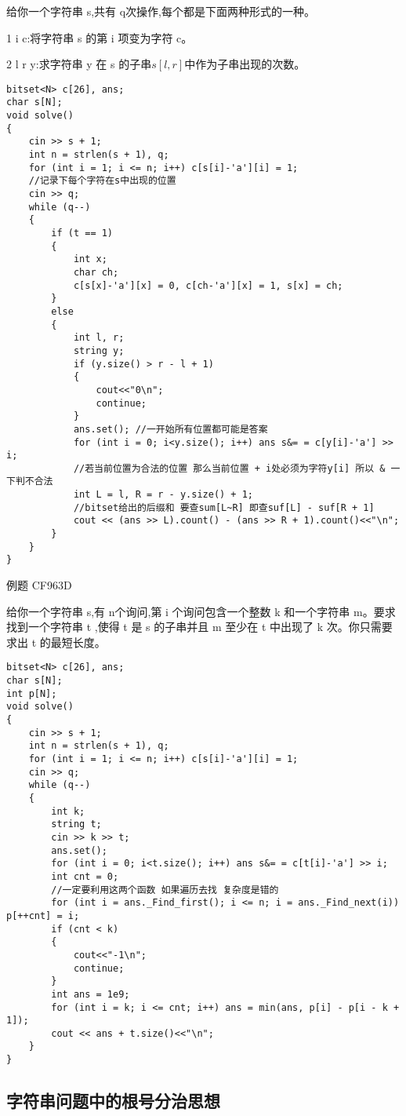 \documentclass[a4paper, fontset=none]{ctexart}
\begin{document}
给你一个字符串 s,共有 q次操作,每个都是下面两种形式的一种。

1 i c:将字符串 s 的第 i 项变为字符 c。

2 l r y:求字符串 y 在 s 的子串$s [l , r]$中作为子串出现的次数。

\begin{verbatim}
bitset<N> c[26], ans;
char s[N];
void solve()
{
    cin >> s + 1;
    int n = strlen(s + 1), q;
    for (int i = 1; i <= n; i++) c[s[i]-'a'][i] = 1;
    //记录下每个字符在s中出现的位置
    cin >> q;
    while (q--)
    {
        if (t == 1)
        {
            int x;
            char ch;
            c[s[x]-'a'][x] = 0, c[ch-'a'][x] = 1, s[x] = ch;
        }
        else
        {
            int l, r;
            string y;
            if (y.size() > r - l + 1)
            {
                cout<<"0\n";
                continue;
            }
            ans.set(); //一开始所有位置都可能是答案
            for (int i = 0; i<y.size(); i++) ans s&= = c[y[i]-'a'] >> i;
            //若当前位置为合法的位置 那么当前位置 + i处必须为字符y[i] 所以 & 一下判不合法
            int L = l, R = r - y.size() + 1;
            //bitset给出的后缀和 要查sum[L~R] 即查suf[L] - suf[R + 1]
            cout << (ans >> L).count() - (ans >> R + 1).count()<<"\n";
        }
    }
}
\end{verbatim}

例题 CF963D

给你一个字符串 s,有 n个询问,第 i 个询问包含一个整数 k 和一个字符串 m。要求找到一个字符串 t ,使得 t 是 s 的子串并且 m 至少在 t 中出现了 k 次。你只需要求出 t 的最短长度。

\begin{verbatim}
bitset<N> c[26], ans;
char s[N];
int p[N];
void solve()
{
    cin >> s + 1;
    int n = strlen(s + 1), q;
    for (int i = 1; i <= n; i++) c[s[i]-'a'][i] = 1;
    cin >> q;
    while (q--)
    {
        int k;
        string t;
        cin >> k >> t;
        ans.set();
        for (int i = 0; i<t.size(); i++) ans s&= = c[t[i]-'a'] >> i;
        int cnt = 0;
        //一定要利用这两个函数 如果遍历去找 复杂度是错的
        for (int i = ans._Find_first(); i <= n; i = ans._Find_next(i)) p[++cnt] = i;
        if (cnt < k)
        {
            cout<<"-1\n";
            continue;
        }
        int ans = 1e9;
        for (int i = k; i <= cnt; i++) ans = min(ans, p[i] - p[i - k + 1]);
        cout << ans + t.size()<<"\n";
    }
}
\end{verbatim}
\subsection{字符串问题中的根号分治思想}
\end{document}
